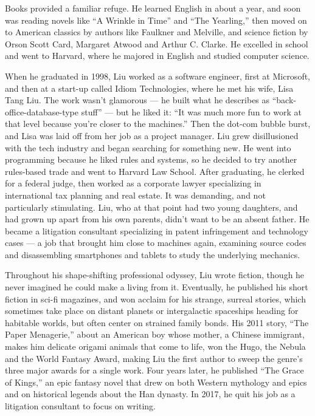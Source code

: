 Books provided a familiar refuge. He learned English in about a year,
and soon was reading novels like ``A Wrinkle in Time'' and ``The
Yearling,'' then moved on to American classics by authors like Faulkner
and Melville, and science fiction by Orson Scott Card, Margaret Atwood
and Arthur C. Clarke. He excelled in school and went to Harvard, where
he majored in English and studied computer science.

When he graduated in 1998, Liu worked as a software engineer, first at
Microsoft, and then at a start-up called Idiom Technologies, where he
met his wife, Lisa Tang Liu. The work wasn't glamorous --- he built what
he describes as ``back-office-database-type stuff'' --- but he liked it:
``It was much more fun to work at that level because you're closer to
the machines.'' Then the dot-com bubble burst, and Lisa was laid off
from her job as a project manager. Liu grew disillusioned with the tech
industry and began searching for something new. He went into programming
because he liked rules and systems, so he decided to try another
rules-based trade and went to Harvard Law School. After graduating, he
clerked for a federal judge, then worked as a corporate lawyer
specializing in international tax planning and real estate. It was
demanding, and not particularly stimulating. Liu, who at that point had
two young daughters, and had grown up apart from his own parents, didn't
want to be an absent father. He became a litigation consultant
specializing in patent infringement and technology cases --- a job that
brought him close to machines again, examining source codes and
disassembling smartphones and tablets to study the underlying mechanics.

Throughout his shape-shifting professional odyssey, Liu wrote fiction,
though he never imagined he could make a living from it. Eventually, he
published his short fiction in sci-fi magazines, and won acclaim for his
strange, surreal stories, which sometimes take place on distant planets
or intergalactic spaceships heading for habitable worlds, but often
center on strained family bonds. His 2011 story, ``The Paper
Menagerie,'' about an American boy whose mother, a Chinese immigrant,
makes him delicate origami animals that come to life, won the Hugo, the
Nebula and the World Fantasy Award, making Liu the first author to sweep
the genre's three major awards for a single work. Four years later, he
published ``The Grace of Kings,'' an epic fantasy novel that drew on
both Western mythology and epics and on historical legends about the Han
dynasty. In 2017, he quit his job as a litigation consultant to focus on
writing.

